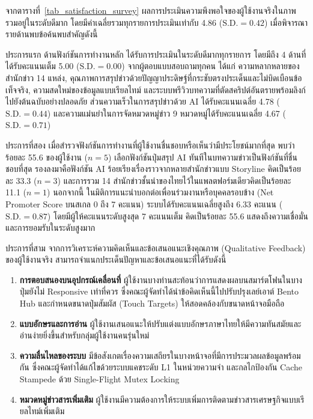 จากตารางที่~\ref{tab_satisfaction_survey} ผลการประเมินความพึงพอใจของผู้ใช้งานจริงในภาพรวมอยู่ในระดับดีมาก โดยมีค่าเฉลี่ยรวมทุกรายการประเมินเท่ากับ 4.86 ($\text{S.D.} = 0.42$) เมื่อพิจารณารายด้านพบข้อค้นพบสำคัญดังนี้

ประการแรก ด้านฟังก์ชันการทำงานหลัก ได้รับการประเมินในระดับดีมากทุกรายการ โดยมีถึง 4 ด้านที่ได้รับคะแนนเต็ม 5.00 ($\text{S.D.} = 0.00$) จากผู้ตอบแบบสอบถามทุกคน ได้แก่ ความหลากหลายของสำนักข่าว 14 แหล่ง, คุณภาพการสรุปข่าวด้วยปัญญาประดิษฐ์ที่กระชับตรงประเด็นและไม่บิดเบือนข้อเท็จจริง, ความสดใหม่ของข้อมูลแบบเรียลไทม์ และระบบพรีวิวบทความที่ตัดสคริปต์อันตรายพร้อมลิงก์ไปยังต้นฉบับอย่างปลอดภัย ส่วนความเร็วในการสรุปข่าวด้วย AI ได้รับคะแนนเฉลี่ย 4.78 ($\text{S.D.} = 0.44$) และความแม่นยำในการจัดหมวดหมู่ข่าว 9 หมวดหมู่ได้รับคะแนนเฉลี่ย 4.67 ($\text{S.D.} = 0.71$)

ประการที่สอง เมื่อสำรวจฟังก์ชันการทำงานที่ผู้ใช้งานชื่นชอบหรือเห็นว่ามีประโยชน์มากที่สุด พบว่า ร้อยละ 55.6 ของผู้ใช้งาน ($n = 5$) เลือกฟังก์ชันปุ่มสรุป AI ทันทีในบทความข่าวเป็นฟังก์ชันที่ชื่นชอบที่สุด รองลงมาคือฟังก์ชัน AI ร้อยเรียงเรื่องราวจากหลายสำนักข่าวแบบ Storyline คิดเป็นร้อยละ 33.3 ($n = 3$) และการรวม 14 สำนักข่าวชั้นนำของไทยไว้ในแพลตฟอร์มเดียวคิดเป็นร้อยละ 11.1 ($n = 1$) นอกจากนี้ ในมิติการแนะนำบอกต่อเพื่อนร่วมงานหรือบุคคลรอบข้าง (Net Promoter Score บนสเกล 0 ถึง 7 คะแนน) ระบบได้รับคะแนนเฉลี่ยสูงถึง 6.33 คะแนน ($\text{S.D.} = 0.87$) โดยมีผู้ให้คะแนนระดับสูงสุด 7 คะแนนเต็ม คิดเป็นร้อยละ 55.6 แสดงถึงความเชื่อมั่นและการยอมรับในระดับสูงมาก

ประการที่สาม จากการวิเคราะห์ความคิดเห็นและข้อเสนอแนะเชิงคุณภาพ (Qualitative Feedback) ของผู้ใช้งานจริง สามารถจำแนกประเด็นปัญหาและข้อเสนอแนะที่ได้รับดังนี้
\begin{enumerate}
    \item \textbf{การตอบสนองบนอุปกรณ์เคลื่อนที่} ผู้ใช้งานบางท่านสะท้อนว่าการแสดงผลบนสมาร์ตโฟนในบางปุ่มยังไม่ Responsive เท่าที่ควร ซึ่งคณะผู้จัดทำได้นำข้อคิดเห็นนี้ไปปรับปรุงเลย์เอาต์ Bento Hub และกำหนดขนาดปุ่มสัมผัส (Touch Targets) ให้สอดคล้องกับขนาดหน้าจอมือถือ
    \item \textbf{แบบอักษรและการอ่าน} ผู้ใช้งานเสนอแนะให้ปรับแต่งแบบอักษรภาษาไทยให้มีความทันสมัยและอ่านง่ายยิ่งขึ้นสำหรับกลุ่มผู้ใช้งานคนรุ่นใหม่
    \item \textbf{ความลื่นไหลของระบบ} มีข้อสังเกตเรื่องความเสถียรในบางหน้าจอที่มีการประมวลผลข้อมูลพร้อมกัน ซึ่งคณะผู้จัดทำได้แก้ไขด้วยระบบแคชระดับ L1 ในหน่วยความจำ และกลไกป้องกัน Cache Stampede ด้วย Single-Flight Mutex Locking
    \item \textbf{หมวดหมู่ข่าวสารเพิ่มเติม} ผู้ใช้งานมีความต้องการให้ระบบเพิ่มการติดตามข่าวสารเศรษฐกิจแบบเรียลไทม์เพิ่มเติม
\end{enumerate}

